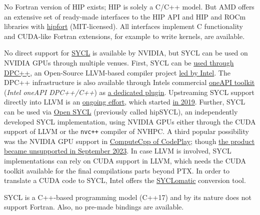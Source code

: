  No Fortran version of HIP exists; HIP is solely a C/C++ model. But AMD offers an extensive set of ready-made interfaces to the HIP API and HIP and ROCm libraries with \href{https://github.com/ROCmSoftwarePlatform/hipfort}{hipfort} (MIT-licensed). All interfaces implement C functionality and CUDA-like Fortran extensions, for example to write kernels, are available.   

 No direct support for \href{https://www.khronos.org/sycl/}{SYCL} is available by NVIDIA, but SYCL can be used on NVIDIA GPUs through multiple venues. First, SYCL can be \href{https://github.com/intel/llvm/blob/sycl/sycl/doc/GetStartedGuide.md\#build-dpc-toolchain-with-support-for-nvidia-cuda}{used through DPC++}, an Open-Source LLVM-based compiler project \href{https://github.com/intel/llvm}{led by Intel}. The DPC++ infrastructure is also available through Intel\textquotesingle s commercial \href{https://www.intel.com/content/www/us/en/developer/tools/oneapi/dpc-compiler.html}{oneAPI toolkit} (\emph{Intel oneAPI DPC++/C++}) as \href{https://developer.codeplay.com/products/oneapi/nvidia/2023.2.1/guides/get-started-guide-nvidia}{a dedicated plugin}. Upstreaming SYCL support directly into LLVM is an \href{https://github.com/intel/llvm/issues/49}{ongoing effort}, which started \href{https://lists.llvm.org/pipermail/cfe-dev/2019-January/060811.html}{in 2019}. Further, SYCL can be used via \href{https://github.com/OpenSYCL/OpenSYCL/}{Open SYCL} (previously called hipSYCL), an independently developed SYCL implementation, using NVIDIA GPUs either through the CUDA support of LLVM or the \texttt{nvc++} compiler of NVHPC. A third popular possibility was the NVIDIA GPU support in \href{https://github.com/codeplaysoftware/sycl-for-cuda/tree/cuda}{ComputeCpp of CodePlay}; though \href{https://developer.codeplay.com/products/computecpp/ce/home/}{the product became unsupported in September 2023}. In case LLVM is involved, SYCL implementations can rely on CUDA support in LLVM, which needs the CUDA toolkit available for the final compilations parts beyond PTX. In order to translate a CUDA code to SYCL, Intel offers the \href{https://github.com/oneapi-src/SYCLomatic}{SYCLomatic} conversion tool.   

 SYCL is a C++-based programming model (C++17) and by its nature does not support Fortran. Also, no pre-made bindings are available.   

